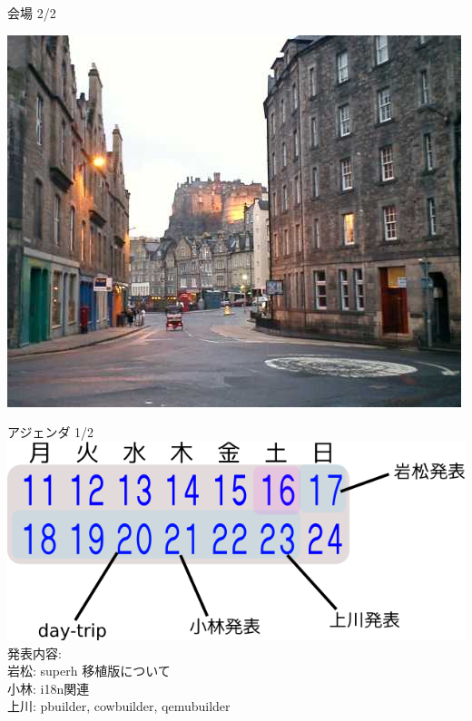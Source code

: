 \documentclass[cjk,dvipdfmx,12pt]{beamer}
\begin{document}
\begin{frame}{会場 2/2}
\begin{minipage}{0.49\hsize}
  \includegraphics[width=1\hsize]{image200707/castle.jpg}
\end{minipage}
\end{frame}

\begin{frame}{アジェンダ 1/2}
  \includegraphics[width=1\hsize]{image200707/schedule.png}\\
発表内容:\\
岩松: superh 移植版について\\
小林: i18n関連\\
上川: pbuilder, cowbuilder, qemubuilder
\end{frame}
\end{document}
